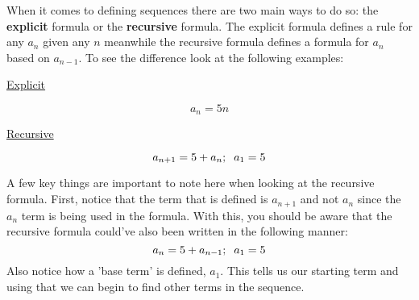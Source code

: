 \documentclass[addpoints]{exam}
\begin{document}
\begin{tcolorbox}[breakable, title=SEQUENCES REVIEW, colframe=black, sharp corners, colback=white, colbacktitle=white, coltitle=black]
        When it comes to defining sequences there are two main ways to do so: the \textbf{explicit} formula or the \textbf{recursive} formula. The explicit formula defines a rule for any $a_n$ given any $n$ meanwhile the recursive formula defines a formula for $a_n$ based on $a_{n-1}$. To see the difference look at the following examples: 
        \vspace{0.2in}
        \newline
        \begin{minipage}{0.45\linewidth}
          \begin{center}
            \underline{Explicit}
          \end{center}
          \[
            a_n = 5n
          \]
        \end{minipage}
        \hfill
        \begin{minipage}{0.45\linewidth}
          \begin{center}
            \underline{Recursive}
          \end{center}
          \[
            a_{n+1} = 5 + a_n \text{;} \hspace{0.1in} a_1 = 5
          \]
        \end{minipage}
        \vspace{0.1in}\newline A few key things are important to note here when looking at the recursive formula. First, notice that the term that is defined is $a_{n+1}$ and not $a_n$ since the $a_n$ term is being used in the formula. With this, you should be aware that the recursive formula could've also been written in the following manner: 
        \newline 
        \[
          a_n = 5 + a_{n-1} \text{;} \hspace{0.1in} a_1 = 5
        \]
        Also notice how a 'base term' is defined, $a_1$. This tells us our starting term and using that we can begin to find other terms in the sequence. 
    \end{tcolorbox}

    \newpage 
\end{document}
